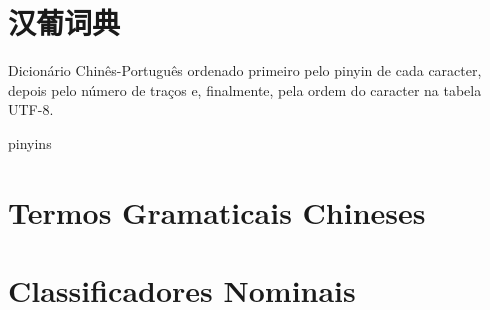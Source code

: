 \documentclass[a4paper,9pt,twoside,openright,book]{memoir}
\begin{document}



\clearpage
\pagestyle{empty}
\tableofcontents

\clearpage
\pagestyle{empty}
\chapter{汉葡词典}

%
%

Dicionário Chinês-Português ordenado primeiro pelo pinyin de cada
caracter, depois pelo número de traços e, finalmente, pela ordem do
caracter na tabela UTF-8.

\clearpage
\begin{DictionaryEntries}{pinyins}
 
 
 
 
 
 
 
 
 
 
 
 
 
 
 
 
 
 
 
 
 
 
 
\end{DictionaryEntries} 

\ifdraftdoc
\else

\pagestyle{plain}

\clearpage
\chapter{Termos Gramaticais Chineses}


\clearpage
\chapter{Classificadores Nominais}

\end{document}
